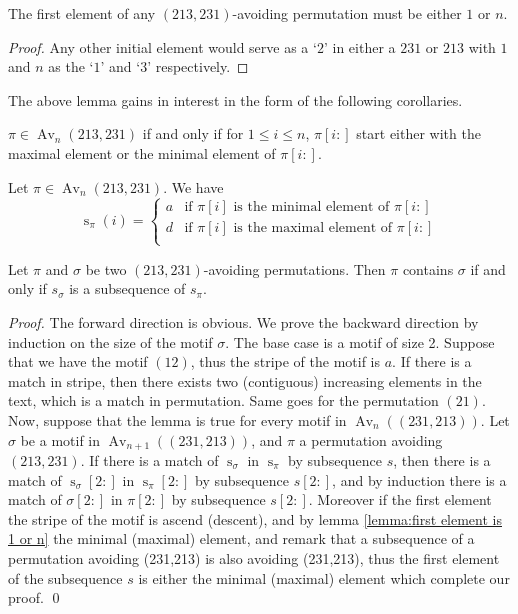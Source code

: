 \documentclass[a4paper]{llncs}
\DeclareMathOperator{\AV}{Av}
\DeclareMathOperator{\Avd}{Av}
\newcommand\Av[2]{\Avd_{{#1}}({#2})}
\newcommand{\ptext}{\pi}
\newcommand{\pmotif}{\sigma}
\DeclareMathOperator{\stripea}{s}
\newcommand{\stripe}[2]{\stripea_{{#1}}({#2})}
\newcommand{\stripew}[1]{\stripea_{{#1}}}
\newcommand{\dstep}{d}
\newcommand{\ustep}{a}
\begin{document}
\begin{lemma}[Folklore]
\label{lemma:first element is 1 or n}
The first element of any $(213,231)$-avoiding permutation
must be either $1$ or $n$.
\end{lemma}

\begin{proof} 
Any other initial element would serve as a `$2$' in either a 
$231$ or $213$ with $1$ and $n$ as the `$1$' and `$3$' respectively.
\end{proof}
	
The above lemma gains in interest in the form of the following corollaries.

\begin{corollary}
\label{corollary:minmaxelement}
$\pi \in \AV_n(213,231)$ if and only if for $1 \leq i \leq n$, 
$\pi[i:]$ start either with the maximal element
or the minimal element of $\pi[i:]$.
\end{corollary}
	
\begin{corollary}
Let $\pi \in \AV_n(213,231)$. We have
$$
\stripe{\pi}{i} =
\begin{cases}
			\ustep & \text{if $\pi[i]$ is the minimal element of $\pi[i:]$}\\    
			\dstep & \text{if $\pi[i]$ is the maximal element of $\pi[i:]$}\\
	\end{cases}
	$$
\end{corollary}
	 
\begin{lemma}
\label{lemma:MatchStripeToPermutation}
	Let $\pi$ and $\sigma$ be two $(213,231)$-avoiding permutations.
	Then $\pi$ contains $\sigma$ if and only if 
	$s_\sigma$ is a subsequence of $s_\pi$.
\end{lemma}	 
	 
\begin{proof} 
	The forward direction is obvious.
	We prove the backward direction by induction on the size of the motif
	$\sigma$.
	The base case is a motif of size 2. Suppose that we have the motif $(12)$, thus the stripe of the motif is $\ustep$. If there is a match in stripe, then there exists two (contiguous) increasing elements in the text, which is a match in permutation. Same goes for the permutation $(21)$. Now, suppose that the lemma is true for every motif in $\Av{n}{(231,213)}$. Let $\pmotif$ be a motif in $\Av{n+1}{(231,213)}$, and $\ptext$ a permutation avoiding $(213,231)$. If there is a match of $\stripew{\pmotif}$ in $\stripew{\ptext}$ by subsequence $s$, then there is a match of $\stripew{\pmotif}[2:]$ in $\stripew{\ptext}[2:]$ by subsequence $s[2:]$, and by induction there is a match of $\pmotif[2:]$ in $\ptext[2:]$ by subsequence $s[2:]$. Moreover if the first element the stripe of the motif is ascend (descent), and by lemma \ref{lemma:first element is 1 or n} the minimal (maximal) element, and remark that a subsequence of a permutation avoiding (231,213) is also avoiding (231,213), thus the first element of the subsequence $s$ is either the minimal (maximal) element which complete our proof.
\qed
\end{proof}	 
\end{document}
